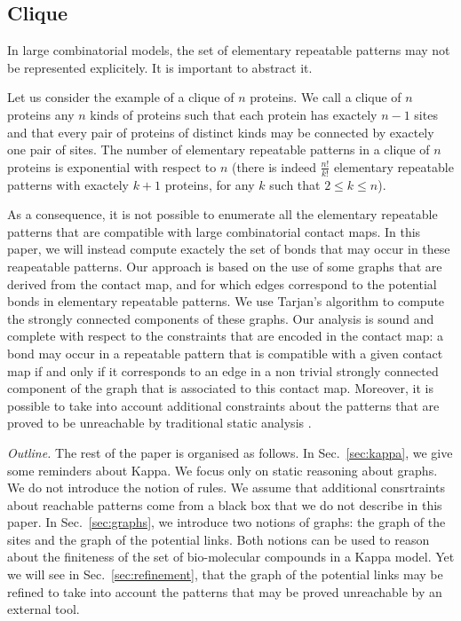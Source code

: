 \documentclass{entcs}
\begin{document}
\subsection{Clique}

In large combinatorial models, the set of elementary repeatable patterns
may not be represented explicitely. It is important to abstract it.

Let us consider the example of a clique of $n$ proteins.
We call a clique of $n$ proteins any $n$ kinds of proteins such that each protein has exactely $n-1$ sites and that every pair of proteins of distinct kinds may be connected by exactely one pair of sites. The number of elementary repeatable patterns in a clique of $n$ proteins  is exponential with respect to $n$ (there is indeed $\frac{n!}{k!}$  elementary repeatable patterns with exactely $k+1$ proteins, for any $k$ such that $2\leq k \leq n$).

As a consequence, it is not possible to enumerate all the elementary repeatable
patterns that are compatible with large combinatorial contact maps. In this paper, we will instead compute exactely the set of bonds that may occur in these reapeatable patterns.
Our approach is based on the use of some graphs that are derived from the contact map, and for which edges correspond to the potential bonds in elementary repeatable patterns. We use Tarjan's algorithm \cite{tarjan} to compute the strongly connected components of these graphs. Our analysis is sound and complete with respect to the constraints that are encoded in the contact map: a bond may occur in a repeatable pattern that is compatible with a given  contact map if and only if it corresponds to an edge in a non trivial strongly connected component of the graph that is associated to this contact map. Moreover, it is possible to take into account additional constraints about the patterns that are proved to be unreachable by traditional static analysis \cite{SASB2016,KaSa}.

\emph{Outline.} The rest of the paper is organised as follows.
In Sec.~\ref{sec:kappa}, we give some reminders about Kappa.
We focus only on static reasoning about graphs. We do not introduce the notion of rules. We assume that
additional consrtraints about reachable patterns come from a black box that we do not describe in this paper. In Sec.~\ref{sec:graphs}, we introduce two notions of graphs: the graph of the sites and the graph of the potential links. Both notions can be used to reason about the finiteness of the set of bio-molecular compounds in a Kappa model. Yet we will see in Sec.~\ref{sec:refinement}, that the graph of the potential links may be refined to take into account the patterns that may be proved unreachable by an external tool.
\end{document}
